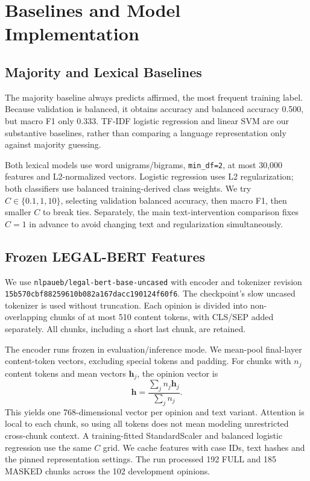 \documentclass[conference]{IEEEtran}
\begin{document}
\section{Baselines and Model Implementation}
\subsection{Majority and Lexical Baselines}
The majority baseline always predicts affirmed, the most frequent training label. Because validation is balanced, it obtains accuracy and balanced accuracy 0.500, but macro F1 only 0.333. TF-IDF logistic regression and linear SVM are our substantive baselines, rather than comparing a language representation only against majority guessing.

Both lexical models use word unigrams/bigrams, \texttt{min\_df=2}, at most 30,000 features and L2-normalized vectors. Logistic regression uses L2 regularization; both classifiers use balanced training-derived class weights. We try $C\in\{0.1,1,10\}$, selecting validation balanced accuracy, then macro F1, then smaller $C$ to break ties. Separately, the main text-intervention comparison fixes $C=1$ in advance to avoid changing text and regularization simultaneously.

\subsection{Frozen LEGAL-BERT Features}
We use \texttt{nlpaueb/legal-bert-base-uncased} with encoder and tokenizer revision \texttt{15b570cbf88259610b082a167dacc190124f60f6}. The checkpoint's slow uncased tokenizer is used without truncation. Each opinion is divided into non-overlapping chunks of at most 510 content tokens, with CLS/SEP added separately. All chunks, including a short last chunk, are retained.

The encoder runs frozen in evaluation/inference mode. We mean-pool final-layer content-token vectors, excluding special tokens and padding. For chunks with $n_j$ content tokens and mean vectors $\mathbf{h}_j$, the opinion vector is
\begin{equation}
\mathbf{h}=\frac{\sum_j n_j\mathbf{h}_j}{\sum_j n_j}.
\end{equation}
This yields one 768-dimensional vector per opinion and text variant. Attention is local to each chunk, so using all tokens does not mean modeling unrestricted cross-chunk context. A training-fitted StandardScaler and balanced logistic regression use the same $C$ grid. We cache features with case IDs, text hashes and the pinned representation settings. The run processed 192 FULL and 185 MASKED chunks across the 102 development opinions.
\end{document}
